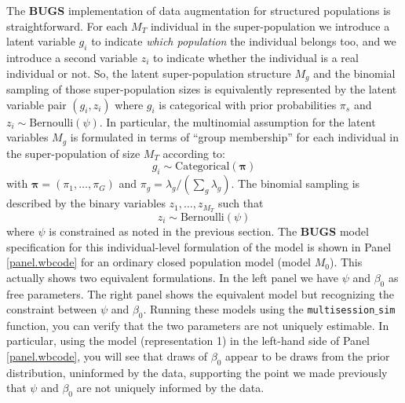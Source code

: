 The {\bf BUGS} implementation of data augmentation for structured
populations is straightforward. 
For each $M_{T}$ individual in the
super-population we introduce a latent variable $g_{i}$ to indicate
{\it which population} the individual belongs too, and we introduce a second
variable $z_{i}$ to indicate whether the individual is a real
individual or not.  So, the latent super-population structure $M_{g}$
and the binomial sampling of those super-population sizes is
equivalently represented by the latent variable pair $(g_{i},z_{i})$
where $g_{i}$ is categorical with prior probabilities $\pi_{s}$ and
$z_{i} \sim \mbox{Bernoulli}(\psi)$.  In particular,
the multinomial assumption
for the latent variables $M_{g}$ is formulated in terms of ``group
membership'' for each individual in the super-population of size $M_{T}$
according to:
\[
 g_{i} \sim \mbox{Categorical}\left( {\bm \pi} \right)
\]
with ${\bm \pi} = (\pi_{1}, \ldots, \pi_{G})$ and $\pi_{g} =
\lambda_{g}/(\sum_{g} \lambda_{g})$.  The binomial sampling is
described by the binary variables $z_{1},\ldots,z_{M_{T}}$ such that
\[
 z_{i} \sim \mbox{Bernoulli}(\psi)
\]
where $\psi$ is constrained as noted in the previous section.  The
{\bf BUGS} model specification for this individual-level formulation
of the model is shown in Panel \ref{panel.wbcode} for an ordinary
closed population model (model $M_{0}$).  This actually shows two
equivalent formulations. In the left panel we have $\psi$ and
$\beta_{0}$ as free parameters.  The right panel shows the equivalent
model but recognizing the constraint between $\psi$ and $\beta_{0}$.
Running these models using the \mbox{\tt multisession$\_$sim}
function, you can verify that the two parameters are not uniquely estimable. In
particular, 
 using the model
(representation 1) in the left-hand side of Panel \ref{panel.wbcode}, 
you will see that 
draws of $\beta_{0}$ 
 appear to be draws from the prior distribution,
uninformed by the data, supporting the point we made previously that
$\psi$ and $\beta_0$ are not uniquely informed by the data.

